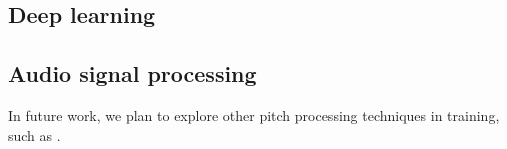 \subsection{Deep learning}

\subsection{Audio signal processing}
In future work, we plan to explore other pitch processing techniques in training, such as \cite{waloschek2018driftin}.

